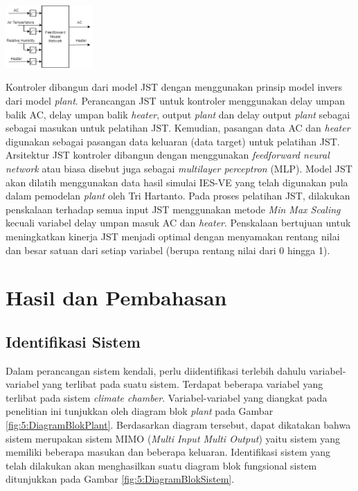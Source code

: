 \documentclass[a4paper,10pt]{article}
\makeatletter
\newenvironment{body}{\begin{multicols}{2}}{\end{multicols}}
\renewenvironment{figure}
{\def\@captype{figure}%
	\captionsetup{labelsep=period,format=hang,font=footnotesize,justification=justified}
}
{}
\makeatother
\begin{document}
\begin{body}
		\begin{figure}
			\centering
			\includegraphics[width=0.25\textwidth]{figures/NNControllerIO}
			\caption{Pasangan masukan dan keluaran model JST kontroler}
			\label{fig:4:NNControlIO}
		\end{figure}
	
		Kontroler dibangun dari model JST dengan menggunakan prinsip model invers dari model \textit{plant}. Perancangan JST untuk kontroler menggunakan delay umpan balik AC, delay umpan balik \textit{heater}, output \textit{plant} dan delay output \textit{plant} sebagai sebagai masukan untuk pelatihan JST. Kemudian, pasangan data AC dan \textit{heater} digunakan sebagai pasangan data keluaran (data target) untuk pelatihan JST. Arsitektur JST kontroler dibangun dengan menggunakan \textit{feedforward neural network} atau biasa disebut juga sebagai \textit{multilayer perceptron} (MLP). Model JST akan dilatih menggunakan data hasil simulai IES-VE yang telah digunakan pula dalam pemodelan \textit{plant} oleh Tri Hartanto\cite{skripsiTanto}. Pada proses pelatihan JST, dilakukan penskalaan terhadap semua input JST menggunakan metode \textit{Min Max Scaling} kecuali variabel delay umpan masuk AC dan \textit{heater}. Penskalaan bertujuan untuk meningkatkan kinerja JST menjadi optimal dengan menyamakan rentang nilai dan besar satuan dari setiap variabel (berupa rentang nilai dari 0 hingga 1).\\
		
		\section{Hasil dan Pembahasan}
		\subsection{Identifikasi Sistem}
		
		Dalam perancangan sistem kendali, perlu diidentifikasi terlebih dahulu variabel-variabel yang terlibat pada suatu sistem. Terdapat beberapa variabel yang terlibat pada sistem \textit{climate chamber}. Variabel-variabel yang diangkat pada penelitian ini tunjukkan oleh diagram blok \textit{plant} pada Gambar \ref{fig:5:DiagramBlokPlant}. Berdasarkan diagram tersebut, dapat dikatakan bahwa sistem merupakan sistem MIMO (\textit{Multi Input Multi Output}) yaitu sistem yang memiliki beberapa masukan dan beberapa keluaran. Identifikasi sistem yang telah dilakukan akan menghasilkan suatu diagram blok fungsional sistem ditunjukkan pada Gambar \ref{fig:5:DiagramBlokSistem}.\\
		

\end{body}
\end{document}
